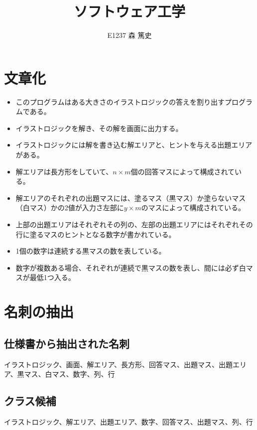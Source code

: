 \documentclass[a4j]{jarticle}
\begin{document}
\title{ソフトウェア工学}

\author{E1237 森 篤史}


\maketitle
\thispagestyle{empty}


\section{文章化}
\begin{itemize}
 \item このプログラムはある大きさのイラストロジックの答えを割り出すプログラムである。
 \item イラストロジックを解き、その解を画面に出力する。
 \item イラストロジックには解を書き込む解エリアと、ヒントを与える出題エリアがある。
 \item 解エリアは長方形をしていて、$n\times m$個の回答マスによって構成されている。
 \item 解エリアのそれぞれの出題マスには、塗るマス（黒マス）か塗らないマス（白マス）かの2値が入力さ左部に$y \times m$のマスによって構成されている。
 \item 上部の出題エリアはそれぞれその列の、左部の出題エリアにはそれぞれその行に塗るマスのヒントとなる数字が書かれている。
 \item 1個の数字は連続する黒マスの数を表している。
 \item 数字が複数ある場合、それぞれが連続で黒マスの数を表し、間には必ず白マスが最低1つ入る。
\end{itemize}

\section{名刺の抽出}
\subsection{仕様書から抽出された名刺}
イラストロジック、画面、解エリア、長方形、回答マス、出題マス、出題エリア、黒マス、白マス、数字、列、行

\subsection{クラス候補}
イラストロジック、解エリア、出題エリア、数字、回答マス、出題マス、列、行
\end{document}
